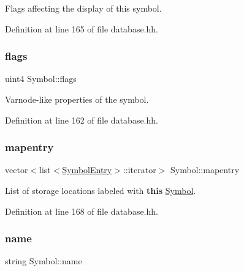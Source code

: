Flags affecting the display of this symbol. 



Definition at line 165 of file database.\+hh.

\mbox{\label{class_symbol_ae27fc3f664b0edbd5cedf859acfb0707}} 
\subsubsection{\texorpdfstring{flags}{flags}}
{\footnotesize\ttfamily uint4 Symbol\+::flags\hspace{0.3cm}{\ttfamily [protected]}}



Varnode-\/like properties of the symbol. 



Definition at line 162 of file database.\+hh.

\mbox{\label{class_symbol_af272879c187d3158f51e8ed58641f7b5}} 
\subsubsection{\texorpdfstring{mapentry}{mapentry}}
{\footnotesize\ttfamily vector$<$list$<$\mbox{\hyperlink{class_symbol_entry}{Symbol\+Entry}}$>$\+::iterator$>$ Symbol\+::mapentry\hspace{0.3cm}{\ttfamily [protected]}}



List of storage locations labeled with {\bfseries{this}} \mbox{\hyperlink{class_symbol}{Symbol}}. 



Definition at line 168 of file database.\+hh.

\mbox{\label{class_symbol_a0254b578a75d2bd6f7e145fe081cb6dd}} 
\subsubsection{\texorpdfstring{name}{name}}
{\footnotesize\ttfamily string Symbol\+::name\hspace{0.3cm}{\ttfamily [protected]}}



